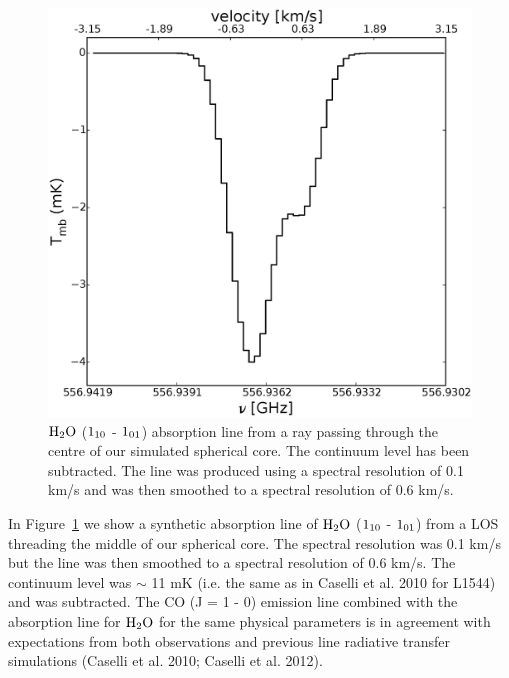 \documentclass{mn2e}
\begin{document}
\begin{figure}
\includegraphics[width=1.0\columnwidth, clip]{absorption.eps}
\caption{$\rm{H_2O}$ ($\rm{1_{10}}$ - $\rm{1_{01}}$) absorption line from a ray passing through the centre of our simulated spherical core. The continuum level has been subtracted. The line was produced using a spectral resolution of 0.1 km/s and was then smoothed to a spectral resolution of 0.6 km/s. 
\label{absorption}}
\end{figure}

In Figure~\ref{absorption} we show a synthetic absorption line of $\rm{H_2O}$ ($\rm{1_{10}}$ - $\rm{1_{01}}$) from a LOS threading the middle of our spherical core. The spectral resolution was 0.1 km/s but the line was then smoothed to a spectral resolution of 0.6 km/s. The continuum level was $\sim$ 11 mK (i.e. the same as in Caselli et al. 2010 for L1544) and was subtracted. The CO (J = 1 - 0) emission line combined with the absorption line for $\rm{H_2O}$ for the same physical parameters is in agreement with expectations from both observations and previous line radiative transfer simulations (Caselli et al. 2010; Caselli et al. 2012).
\end{document}
